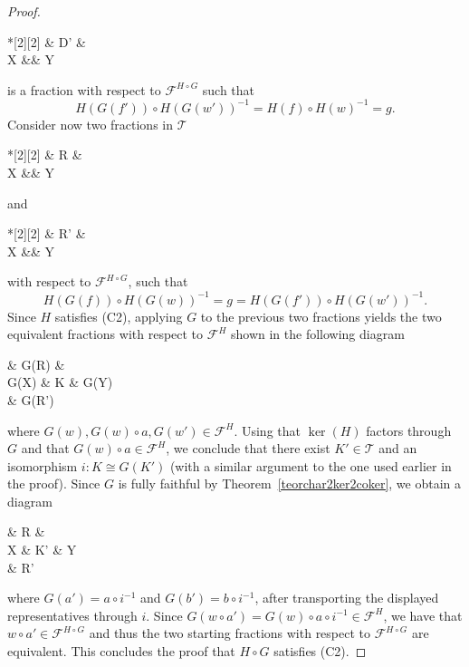 \documentclass[11pt,reqno,a4paper]{amsart}
\theoremstyle{definition}
\theoremstyle{remark}
\def\nameit#1{\textrm{#1}~}
\def\thex{\nameit{Theorem}}
\newcommand{\T}{\mathcal{T}}
\newcommand{\F}{\mathcal{F}}
\newcommand{\0}{\mathbf{0}}
\renewcommand{\1}{\mathbf{1}}
\def\:{\colon}
\def\c{\circ}
\newcommand{\iso}{\cong}
\newcommand{\aiso}[1]{\overset{#1}{\iso}}
\begin{document}
\begin{proof}
    \begin{cd}*[2][2] \& D' \& \\[-2ex]
	X \&\& Y
	\arrow["w'"', from=1-2, to=2-1]
	\arrow["f'", from=1-2, to=2-3]\end{cd} is a fraction with respect to $\F^{H\c G}$ such that
    $$H(G(f')) \c H(G(w'))^{-1}=H(f) \c H(w)^{-1}=g.$$
    Consider now two fractions in $\T$ \begin{cd}*[2][2] \& R \& \\[-2ex]
	X \&\& Y
	\arrow["w"', from=1-2, to=2-1]
	\arrow["f", from=1-2, to=2-3]\end{cd} and \begin{cd}*[2][2] \& R' \& \\[-2ex]
	X \&\& Y
	\arrow["w'"', from=1-2, to=2-1]
	\arrow["f'", from=1-2, to=2-3]\end{cd} with respect to $\F^{H\c G}$, such that
    $$H(G(f)) \c H(G(w))^{-1}=g=H(G(f')) \c H(G(w'))^{-1}.$$
    Since $H$ satisfies (C2), applying $G$ to the previous two fractions yields the two equivalent fractions with respect to $\F^H$ shown in the following diagram
    \begin{cd}[4][5]
        \& {G(R)} \& \\
	{G(X)} \& K \& {G(Y)} \\
	\& {G(R')}
	\arrow["{G(w)}"', from=1-2, to=2-1]
	\arrow["{G(f)}", from=1-2, to=2-3]
	\arrow["a"', from=2-2, to=1-2]
	\arrow[from=2-2, to=2-1]
	\arrow[from=2-2, to=2-3]
	\arrow["b", from=2-2, to=3-2]
	\arrow["{G(w')}", from=3-2, to=2-1]
	\arrow["{G(f')}"', from=3-2, to=2-3]
    \end{cd}
    where $G(w),G(w)\c a,G(w')\in \F^H$. Using that $\ker(H)$ factors through $G$ and that $G(w)\c a\in \F^H$, we  conclude that there exist $K'\in \T$ and an isomorphism $i\: K \aiso{} G(K')$ (with a similar argument to the one used earlier in the proof). Since $G$ is fully faithful by \thex \ref{teorchar2ker2coker}, we obtain a diagram
    \begin{cd}[4]
        \& R \& \\
	X \& K' \& Y \\
	\& R'
	\arrow["w"', from=1-2, to=2-1]
	\arrow["f", from=1-2, to=2-3]
	\arrow["{a'}"', from=2-2, to=1-2]
	\arrow[from=2-2, to=2-1]
	\arrow[from=2-2, to=2-3]
	\arrow["{b'}", from=2-2, to=3-2]
	\arrow["{w'}", from=3-2, to=2-1]
	\arrow["{f'}"', from=3-2, to=2-3]
    \end{cd}
    where $G(a')=a\c i^{-1}$ and $G(b')=b\c i^{-1}$, after transporting the displayed representatives through $i$.
    Since $G(w\c a')=G(w) \c a\c i^{-1}\in\F^H$, we have that $w\c a'\in \F^{H\c G}$ and thus the two starting fractions with respect to $\F^{H\c G}$ are equivalent. This concludes the proof that $H\c G$ satisfies (C2).


\end{proof}
\end{document}
